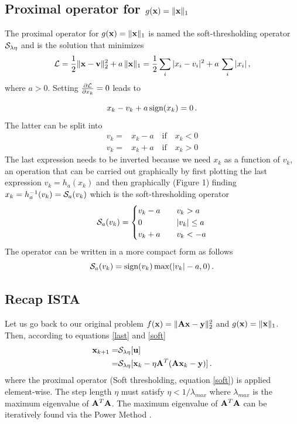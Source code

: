 \documentclass[11pt, oneside]{article}  	%
\def\be{\vspace{0.0cm}\begin{equation}}
\def\ee{\vspace{0.0cm}\end{equation}}
\begin{document}
\subsection{Proximal operator for $g({\bf x}) = \|{\bf x}\|_1$}

The proximal operator for $g({\bf x}) = \| {\bf x} \|_1$ is named the soft-thresholding operator ${\cal S}_{\lambda \eta}$ and is the solution that
minimizes 
\be {\cal L} = \frac{1}{2} \| {\bf x} -{\bf v}\|_2^2 + a\, \|{\bf x}\|_1 = \frac{1}{2} \sum_i | x_i - v_i|^2 + a\, \sum_i | x_i |\,,\ee
where $a>0$. 
Setting $\frac{ \partial {\cal L}}{\partial x_k}=0$ leads to 

\be x_k-v_k + a\, \mbox{sign}(x_k)=0\,. \label{soft_1}\ee
The latter can be split into  
\begin{align}
v_k =& x_k - a \quad \mbox{if} \quad x_k<0\\
v_k = &x_k + a \quad \mbox{if} \quad x_k>0
\end{align}
The last expression needs to be inverted because we need $x_k$ as a function of $v_k$, an operation that
can be carried out graphically by first plotting the last expression $v_k=h_a(x_k)$ and then graphically (Figure 1) finding $x_k=h_a^{-1}(v_k)={\cal S}_{a}(v_k)$ which is
the soft-thresholding operator
\be
{\cal S}_{a}(v_k) =
\begin{cases}
  v_k - a& \quad  v_k > a\\
  0   &\quad   |v_k|\leq a  \\
  v_k + a& \quad v_k < -a
\end{cases} \label{soft}
\ee
 The operator
can be written in a more compact form as follows
\begin{equation}
{\cal S}_{a}(v_k) = \mbox{sign}( v_k )\, \mbox{max}( |v_k |-a, 0)\,.
\end{equation}


\subsection{Recap ISTA}
Let us go back to our original problem $f({\bf x}) = \| {\bf A } {\bf x} - {\bf y}\|_2^2$ and $g({\bf x}) = \| {\bf x} \|_1$. Then, according to equations \ref{last} and \ref{soft}
\begin{align}
{\bf x}_{k+1} = & {\cal S}_{\lambda \eta} [{\bf u}]\\
           = & {\cal S}_{\lambda \eta} [{\bf x}_{k} - \eta {\bf A}^T ({\bf A} {\bf x}_k -{\bf y}) ] \,. \label{last2} 
\end{align}
where the proximal operator (Soft thresholding, equation \ref{soft}) is applied element-wise.
The step length $\eta$  must satisfy $\eta< 1/\lambda_{max}$ where $\lambda_{max}$ is the maximum eigenvalue
of ${\bf A}^T {\bf A}$. The maximum eigenvalue of ${\bf A}^T{\bf A}$ can be iteratively found via the Power Method \citep{GoluVanl96}.
\end{document}
